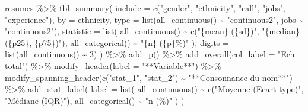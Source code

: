 \documentclass[
  11pt,
]{book}
\newenvironment{Shaded}{\begin{snugshade}}{\end{snugshade}}
\newcommand{\AttributeTok}[1]{\textcolor[rgb]{0.77,0.63,0.00}{#1}}
\newcommand{\DecValTok}[1]{\textcolor[rgb]{0.00,0.00,0.81}{#1}}
\newcommand{\FunctionTok}[1]{\textcolor[rgb]{0.00,0.00,0.00}{#1}}
\newcommand{\NormalTok}[1]{#1}
\newcommand{\SpecialCharTok}[1]{\textcolor[rgb]{0.00,0.00,0.00}{#1}}
\newcommand{\StringTok}[1]{\textcolor[rgb]{0.31,0.60,0.02}{#1}}
\numberwithin{equation}{section}
\numberwithin{countremarque}{section}
\begin{document}
\begin{Shaded}
\begin{Highlighting}[]
\NormalTok{resumes }\SpecialCharTok{\%\textgreater{}\%}
  \FunctionTok{tbl\_summary}\NormalTok{(}
    \AttributeTok{include =} \FunctionTok{c}\NormalTok{(}\StringTok{"gender"}\NormalTok{, }\StringTok{"ethnicity"}\NormalTok{, }\StringTok{"call"}\NormalTok{, }\StringTok{"jobs"}\NormalTok{, }\StringTok{"experience"}\NormalTok{),}
    \AttributeTok{by =}\NormalTok{ ethnicity,}
    \AttributeTok{type =} \FunctionTok{list}\NormalTok{(}\FunctionTok{all\_continuous}\NormalTok{() }\SpecialCharTok{\textasciitilde{}} \StringTok{"continuous2"}\NormalTok{,}
\NormalTok{                jobs }\SpecialCharTok{\textasciitilde{}} \StringTok{"continuous2"}\NormalTok{),}
    \AttributeTok{statistic =} \FunctionTok{list}\NormalTok{(}
      \FunctionTok{all\_continuous}\NormalTok{() }\SpecialCharTok{\textasciitilde{}} \FunctionTok{c}\NormalTok{(}\StringTok{"\{mean\} (\{sd\})"}\NormalTok{, }\StringTok{"\{median\} (\{p25\}, \{p75\})"}\NormalTok{),}
      \FunctionTok{all\_categorical}\NormalTok{() }\SpecialCharTok{\textasciitilde{}} \StringTok{"\{n\} (\{p\}\%)"}
\NormalTok{      ),}
    \AttributeTok{digits =} \FunctionTok{list}\NormalTok{(}\FunctionTok{all\_continuous}\NormalTok{() }\SpecialCharTok{\textasciitilde{}} \DecValTok{3}\NormalTok{)}
\NormalTok{    ) }\SpecialCharTok{\%\textgreater{}\%} 
  \FunctionTok{add\_p}\NormalTok{() }\SpecialCharTok{\%\textgreater{}\%} 
  \FunctionTok{add\_overall}\NormalTok{(}\AttributeTok{col\_label =} \StringTok{"Ech. total"}\NormalTok{) }\SpecialCharTok{\%\textgreater{}\%} 
  \FunctionTok{modify\_header}\NormalTok{(}\AttributeTok{label =} \StringTok{"**Variable**"}\NormalTok{) }\SpecialCharTok{\%\textgreater{}\%} 
  \FunctionTok{modify\_spanning\_header}\NormalTok{(}\FunctionTok{c}\NormalTok{(}\StringTok{"stat\_1"}\NormalTok{, }\StringTok{"stat\_2"}\NormalTok{) }\SpecialCharTok{\textasciitilde{}} \StringTok{"**Consonnance du nom**"}\NormalTok{) }\SpecialCharTok{\%\textgreater{}\%} 
  \FunctionTok{add\_stat\_label}\NormalTok{(}
    \AttributeTok{label =} \FunctionTok{list}\NormalTok{(}
      \FunctionTok{all\_continuous}\NormalTok{() }\SpecialCharTok{\textasciitilde{}} \FunctionTok{c}\NormalTok{(}\StringTok{"Moyenne (Ecart{-}type)"}\NormalTok{, }\StringTok{"Médiane (IQR)"}\NormalTok{),}
      \FunctionTok{all\_categorical}\NormalTok{() }\SpecialCharTok{\textasciitilde{}} \StringTok{"n (\%)"}
\NormalTok{    )}
\NormalTok{  )}
\end{Highlighting}
\end{Shaded}
\end{document}
